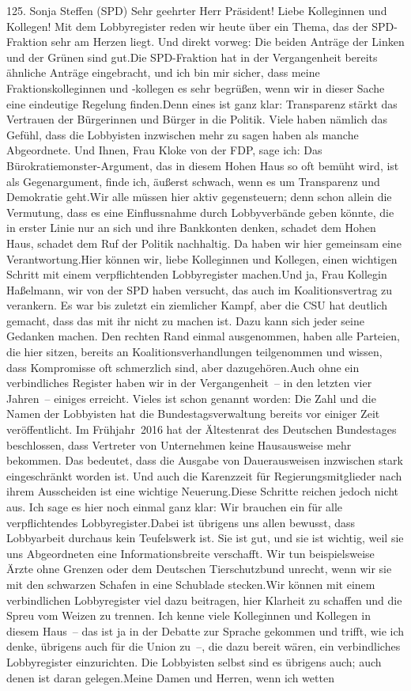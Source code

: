 \documentclass{article}
\begin{document}
	125. Sonja Steffen (SPD) Sehr geehrter Herr Präsident! Liebe Kolleginnen und Kollegen! Mit dem Lobbyregister reden wir heute über ein Thema, das der SPD-Fraktion sehr am Herzen liegt. Und direkt vorweg: Die beiden Anträge der Linken und der Grünen sind gut.Die SPD-Fraktion hat in der Vergangenheit bereits ähnliche Anträge eingebracht, und ich bin mir sicher, dass meine Fraktionskolleginnen und ‑kollegen es sehr begrüßen, wenn wir in dieser Sache eine eindeutige Regelung finden.Denn eines ist ganz klar: Transparenz stärkt das Vertrauen der Bürgerinnen und Bürger in die Politik. Viele haben nämlich das Gefühl, dass die Lobbyisten inzwischen mehr zu sagen haben als manche Abgeordnete. Und Ihnen, Frau Kloke von der FDP, sage ich: Das Bürokratiemonster-Argument, das in diesem Hohen Haus so oft bemüht wird, ist als Gegenargument, finde ich, äußerst schwach, wenn es um Transparenz und Demokratie geht.Wir alle müssen hier aktiv gegensteuern; denn schon allein die Vermutung, dass es eine Einflussnahme durch Lobbyverbände geben könnte, die in erster Linie nur an sich und ihre Bankkonten denken, schadet dem Hohen Haus, schadet dem Ruf der Politik nachhaltig. Da haben wir hier gemeinsam eine Verantwortung.Hier können wir, liebe Kolleginnen und Kollegen, einen wichtigen Schritt mit einem verpflichtenden Lobbyregister machen.Und ja, Frau Kollegin Haßelmann, wir von der SPD haben versucht, das auch im Koalitionsvertrag zu verankern. Es war bis zuletzt ein ziemlicher Kampf, aber die CSU hat deutlich gemacht, dass das mit ihr nicht zu machen ist. Dazu kann sich jeder seine Gedanken machen. Den rechten Rand einmal ausgenommen, haben alle Parteien, die hier sitzen, bereits an Koalitionsverhandlungen teilgenommen und wissen, dass Kompromisse oft schmerzlich sind, aber dazugehören.Auch ohne ein verbindliches Register haben wir in der Vergangenheit – in den letzten vier Jahren – einiges erreicht. Vieles ist schon genannt worden: Die Zahl und die Namen der Lobbyisten hat die Bundestagsverwaltung bereits vor einiger Zeit veröffentlicht. Im Frühjahr 2016 hat der Ältestenrat des Deutschen Bundestages beschlossen, dass Vertreter von Unternehmen keine Hausausweise mehr bekommen. Das bedeutet, dass die Ausgabe von Dauerausweisen inzwischen stark eingeschränkt worden ist. Und auch die Karenzzeit für Regierungsmitglieder nach ihrem Ausscheiden ist eine wichtige Neuerung.Diese Schritte reichen jedoch nicht aus. Ich sage es hier noch einmal ganz klar: Wir brauchen ein für alle verpflichtendes Lobbyregister.Dabei ist übrigens uns allen bewusst, dass Lobbyarbeit durchaus kein Teufelswerk ist. Sie ist gut, und sie ist wichtig, weil sie uns Abgeordneten eine Informationsbreite verschafft. Wir tun beispielsweise Ärzte ohne Grenzen oder dem Deutschen Tierschutzbund unrecht, wenn wir sie mit den schwarzen Schafen in eine Schublade stecken.Wir können mit einem verbindlichen Lobbyregister viel dazu beitragen, hier Klarheit zu schaffen und die Spreu vom Weizen zu trennen. Ich kenne viele Kolleginnen und Kollegen in diesem Haus – das ist ja in der Debatte zur Sprache gekommen und trifft, wie ich denke, übrigens auch für die Union zu –, die dazu bereit wären, ein verbindliches Lobbyregister einzurichten. Die Lobbyisten selbst sind es übrigens auch; auch denen ist daran gelegen.Meine Damen und Herren, wenn ich wetten 
\end{document}
